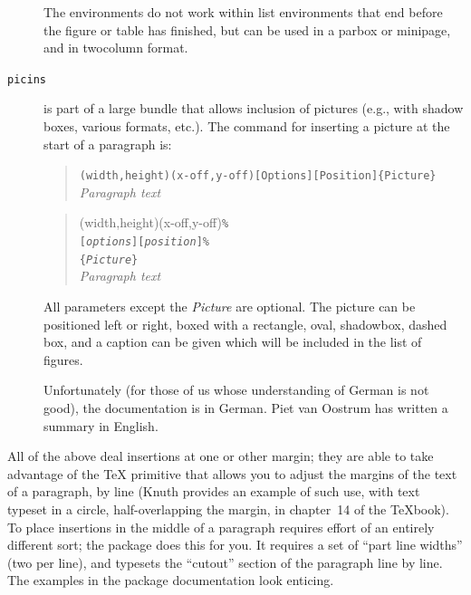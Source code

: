 \begin{description}
    The environments do not work within list environments that end
    before the figure or table has finished, but can be used in a
    parbox or minipage, and in twocolumn format.
  \item[\texttt{picins}]  is part of a large bundle
    that allows inclusion of pictures (e.g., with shadow boxes,
    various \MSDOS{} formats, etc.).  The command for inserting a
    picture at the start of a paragraph is:
\begin{wideversion}
  \begin{quote}
    \texttt{(width,height)(x-off,y-off)[Options][Position]\{Picture\}}\\
    \emph{Paragraph text}
  \end{quote}
\end{wideversion}
\begin{narrowversion}
  \begin{quote}
    (width,height)(x-off,y-off)\texttt{\%}\\
    \mbox{\qquad\qquad}\texttt{[\emph{options}][\emph{position}]\%}\\
    \mbox{\qquad\qquad}\texttt{\{\emph{Picture}\}}\\
    \emph{Paragraph text}
  \end{quote}
\end{narrowversion}  
  All parameters except the \emph{Picture} are optional.  The picture
  can be positioned left or right, boxed with a rectangle, oval,
  shadowbox, dashed box, and a caption can be given which will be
  included in the list of figures.

  Unfortunately (for those of us whose understanding of German is not
  good), the documentation is in German.  Piet van Oostrum has written
  a summary in English.
\end{description}
All of the above deal insertions at one or other margin; they are able
to take advantage of the \TeX{}  primitive that allows
you to adjust the margins of the text of a paragraph, by line (Knuth
provides an example of such use, with text typeset in a circle,
half-overlapping the margin, in chapter~14 of the \TeX{}book).  To
place insertions in the middle of a paragraph requires effort of an
entirely different sort; the  package does this for
you.  It requires a set of ``part line widths'' (two per line), and
typesets the ``cutout'' section of the paragraph line by line.  The
examples in the package documentation look enticing.

